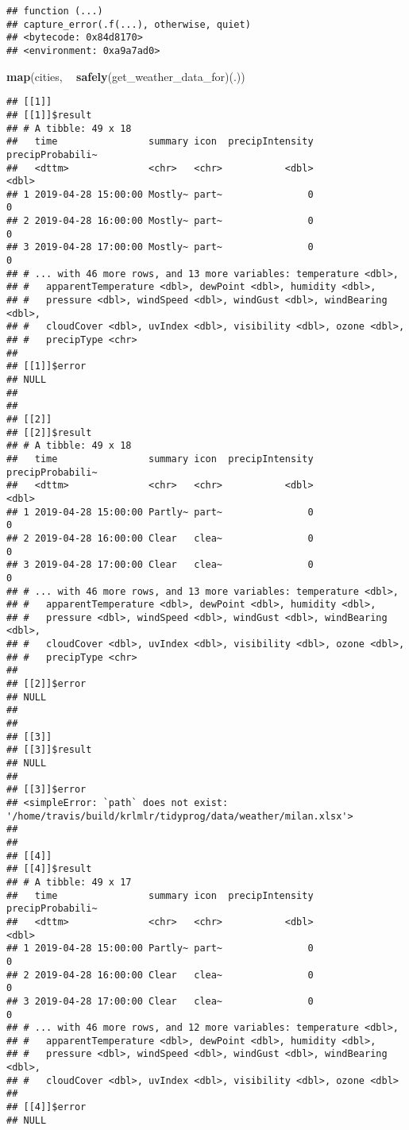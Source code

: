 \documentclass[]{book}
\newenvironment{Shaded}{\begin{snugshade}}{\end{snugshade}}
\newcommand{\KeywordTok}[1]{\textcolor[rgb]{0.13,0.29,0.53}{\textbf{#1}}}
\newcommand{\NormalTok}[1]{#1}
\newcommand{\OperatorTok}[1]{\textcolor[rgb]{0.81,0.36,0.00}{\textbf{#1}}}
\newcommand{\StringTok}[1]{\textcolor[rgb]{0.31,0.60,0.02}{#1}}
\begin{document}
\begin{verbatim}
## function (...) 
## capture_error(.f(...), otherwise, quiet)
## <bytecode: 0x84d8170>
## <environment: 0xa9a7ad0>
\end{verbatim}

\begin{Shaded}
\begin{Highlighting}[]
\KeywordTok{map}\NormalTok{(cities, }\OperatorTok{~}\StringTok{ }\KeywordTok{safely}\NormalTok{(get_weather_data_for)(.))}
\end{Highlighting}
\end{Shaded}

\begin{verbatim}
## [[1]]
## [[1]]$result
## # A tibble: 49 x 18
##   time                summary icon  precipIntensity precipProbabili~
##   <dttm>              <chr>   <chr>           <dbl>            <dbl>
## 1 2019-04-28 15:00:00 Mostly~ part~               0                0
## 2 2019-04-28 16:00:00 Mostly~ part~               0                0
## 3 2019-04-28 17:00:00 Mostly~ part~               0                0
## # ... with 46 more rows, and 13 more variables: temperature <dbl>,
## #   apparentTemperature <dbl>, dewPoint <dbl>, humidity <dbl>,
## #   pressure <dbl>, windSpeed <dbl>, windGust <dbl>, windBearing <dbl>,
## #   cloudCover <dbl>, uvIndex <dbl>, visibility <dbl>, ozone <dbl>,
## #   precipType <chr>
## 
## [[1]]$error
## NULL
## 
## 
## [[2]]
## [[2]]$result
## # A tibble: 49 x 18
##   time                summary icon  precipIntensity precipProbabili~
##   <dttm>              <chr>   <chr>           <dbl>            <dbl>
## 1 2019-04-28 15:00:00 Partly~ part~               0                0
## 2 2019-04-28 16:00:00 Clear   clea~               0                0
## 3 2019-04-28 17:00:00 Clear   clea~               0                0
## # ... with 46 more rows, and 13 more variables: temperature <dbl>,
## #   apparentTemperature <dbl>, dewPoint <dbl>, humidity <dbl>,
## #   pressure <dbl>, windSpeed <dbl>, windGust <dbl>, windBearing <dbl>,
## #   cloudCover <dbl>, uvIndex <dbl>, visibility <dbl>, ozone <dbl>,
## #   precipType <chr>
## 
## [[2]]$error
## NULL
## 
## 
## [[3]]
## [[3]]$result
## NULL
## 
## [[3]]$error
## <simpleError: `path` does not exist: '/home/travis/build/krlmlr/tidyprog/data/weather/milan.xlsx'>
## 
## 
## [[4]]
## [[4]]$result
## # A tibble: 49 x 17
##   time                summary icon  precipIntensity precipProbabili~
##   <dttm>              <chr>   <chr>           <dbl>            <dbl>
## 1 2019-04-28 15:00:00 Partly~ part~               0                0
## 2 2019-04-28 16:00:00 Clear   clea~               0                0
## 3 2019-04-28 17:00:00 Clear   clea~               0                0
## # ... with 46 more rows, and 12 more variables: temperature <dbl>,
## #   apparentTemperature <dbl>, dewPoint <dbl>, humidity <dbl>,
## #   pressure <dbl>, windSpeed <dbl>, windGust <dbl>, windBearing <dbl>,
## #   cloudCover <dbl>, uvIndex <dbl>, visibility <dbl>, ozone <dbl>
## 
## [[4]]$error
## NULL
\end{verbatim}
\end{document}
